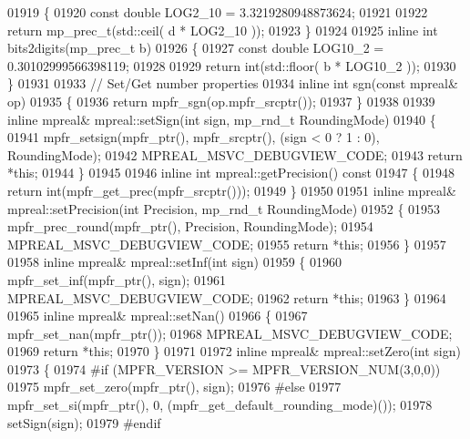 \begin{DoxyCode}
{{01919 \{
01920     \textcolor{keyword}{const} \textcolor{keywordtype}{double} LOG2\_10 = 3.3219280948873624;
01921 
01922     \textcolor{keywordflow}{return} mp\_prec\_t(std::ceil( d * LOG2\_10 ));
01923 \}
01924 
01925 \textcolor{keyword}{inline} \textcolor{keywordtype}{int} bits2digits(mp\_prec\_t b)
01926 \{
01927     \textcolor{keyword}{const} \textcolor{keywordtype}{double} LOG10\_2 = 0.30102999566398119;
01928 
01929     \textcolor{keywordflow}{return} int(std::floor( b * LOG10\_2 ));
01930 \}
01931 
01933 \textcolor{comment}{// Set/Get number properties}
01934 \textcolor{keyword}{inline} \textcolor{keywordtype}{int} sgn(\textcolor{keyword}{const} mpreal& op)
01935 \{
01936     \textcolor{keywordflow}{return} mpfr\_sgn(op.mpfr\_srcptr());
01937 \}
01938 
01939 \textcolor{keyword}{inline} mpreal& mpreal::setSign(\textcolor{keywordtype}{int} sign, mp\_rnd\_t RoundingMode)
01940 \{
01941     mpfr\_setsign(mpfr\_ptr(), mpfr\_srcptr(), (sign < 0 ? 1 : 0), RoundingMode);
01942     MPREAL\_MSVC\_DEBUGVIEW\_CODE;
01943     \textcolor{keywordflow}{return} *\textcolor{keyword}{this};
01944 \}
01945 
01946 \textcolor{keyword}{inline} \textcolor{keywordtype}{int} mpreal::getPrecision()\textcolor{keyword}{ const}
01947 \textcolor{keyword}{}\{
01948     \textcolor{keywordflow}{return} int(mpfr\_get\_prec(mpfr\_srcptr()));
01949 \}
01950 
01951 \textcolor{keyword}{inline} mpreal& mpreal::setPrecision(\textcolor{keywordtype}{int} Precision, mp\_rnd\_t RoundingMode)
01952 \{
01953     mpfr\_prec\_round(mpfr\_ptr(), Precision, RoundingMode);
01954     MPREAL\_MSVC\_DEBUGVIEW\_CODE;
01955     \textcolor{keywordflow}{return} *\textcolor{keyword}{this};
01956 \}
01957 
01958 \textcolor{keyword}{inline} mpreal& mpreal::setInf(\textcolor{keywordtype}{int} sign)
01959 \{
01960     mpfr\_set\_inf(mpfr\_ptr(), sign);
01961     MPREAL\_MSVC\_DEBUGVIEW\_CODE;
01962     \textcolor{keywordflow}{return} *\textcolor{keyword}{this};
01963 \}
01964 
01965 \textcolor{keyword}{inline} mpreal& mpreal::setNan()
01966 \{
01967     mpfr\_set\_nan(mpfr\_ptr());
01968     MPREAL\_MSVC\_DEBUGVIEW\_CODE;
01969     \textcolor{keywordflow}{return} *\textcolor{keyword}{this};
01970 \}
01971 
01972 \textcolor{keyword}{inline} mpreal& mpreal::setZero(\textcolor{keywordtype}{int} sign)
01973 \{
01974 \textcolor{preprocessor}{#if (MPFR\_VERSION >= MPFR\_VERSION\_NUM(3,0,0))}
01975     mpfr\_set\_zero(mpfr\_ptr(), sign);
01976 \textcolor{preprocessor}{#else}
01977     mpfr\_set\_si(mpfr\_ptr(), 0, (mpfr\_get\_default\_rounding\_mode)());
01978     setSign(sign);
01979 \textcolor{preprocessor}{#endif}
}}
\end{DoxyCode}
